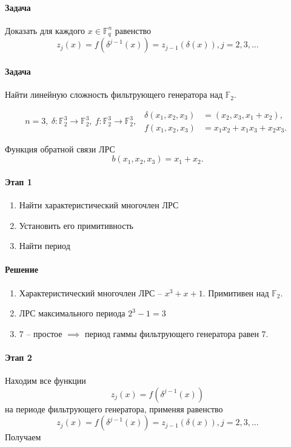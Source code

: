\documentclass[a4paper,12pt]{article}
\begin{document}
	\paragraph{Задача} Доказать для каждого $x \in \mathbb{F}_q^n$ равенство \[ z_j(x) = f(\delta^{j-1}(x)) = z_{j-1}(\delta(x)), j = 2,3,... \]
	\paragraph{Задача} Найти линейную сложность фильтрующего генератора над $\mathbb{F}_2$.
	
	$$
	n = 3, ~ \delta: \mathbb{F}_2^3 \rightarrow \mathbb{F}_2^3, ~ f: \mathbb{F}_2^3 \rightarrow \mathbb{F}_2^3, ~~
	\begin{aligned}
		\delta(x_1, x_2, x_3) &= (x_2, x_3, x_1 + x_2),\\
		f(x_1, x_2, x_3) &= x_1x_2 + x_1x_3 + x_2x_3.
	\end{aligned}
	$$
	
	Функция обратной связи ЛРС \[ b(x_1, x_2, x_3) = x_1 + x_2. \]
	\paragraph{Этап 1}
	\begin{enumerate}
	\item Найти характеристический многочлен ЛРС
	\item Установить его примитивность
	\item Найти период
	\end{enumerate}
	\paragraph{Решение}
	\begin{enumerate}
	\item Характеристический многочлен ЛРС -- $x^3 + x + 1$. Примитивен над $\mathbb{F}_2.$
	\item ЛРС максимального периода $2^3 - 1 = 3$
	\item $7$ -- простое $\implies$ период гаммы фильтрующего генератора равен $7$.
	\end{enumerate}
	\paragraph{Этап 2}
	Находим все функции \[ z_j(x) = f(\delta^{j-1}(x)) \] на периоде фильтрующего генератора, применяя равенство \[ z_j(x) = f(\delta^{j-1}(x)) = z_{j-1}(\delta(x)), j = 2,3,... \]
	Получаем
	
\end{document}
